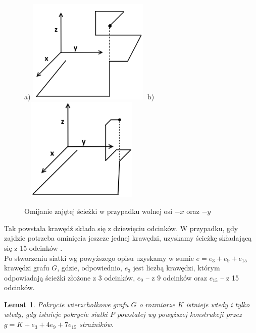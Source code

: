 \documentclass[brudnopis]{xmgr}
\newtheorem{Lemat}{Lemat}
\theoremstyle{definition}
\begin{document}
\begin{figure}[ht!]
  \centering
  a)\includegraphics[width=6cm,height=5cm]{rysunki/zajete_z.png}
  b)\includegraphics[width=6cm,height=5cm]{rysunki/zajete_z2.png}
  \caption{Omijanie zajętej ścieżki w przypadku wolnej osi $-x$ oraz $-y$}
  \label{fig:nakladanie}
\end{figure} 

Tak powstała krawędź składa się z dziewięciu odcinków. W przypadku, gdy zajdzie potrzeba ominięcia jeszcze jednej krawędzi, uzyskamy ścieżkę składającą się z 15 odcinków \cite{orourke}.
\\\indent Po stworzeniu siatki wg powyższego opisu uzyskamy w sumie $e = e_3 + e_9 + e_{15}$ krawędzi grafu $G$, gdzie, odpowiednio, $e_3$  jest liczbą krawędzi, którym odpowiadają ścieżki złożone z 3 odcinków, $e_9$ -- z 9 odcinków oraz $e_{15}$ -- z 15 odcinków.

\begin{Lemat} \cite{orourke} \label{pokrycie wierzcholkowe}
	Pokrycie wierzchołkowe grafu $G$ o rozmiarze $K$ istnieje wtedy i tylko wtedy, gdy istnieje pokrycie siatki $P$ powstałej wg powyższej konstrukcji przez $g = K + e_3 + 4e_9 + 7e_{15}$ strażników.
\end{Lemat}
\end{document}
